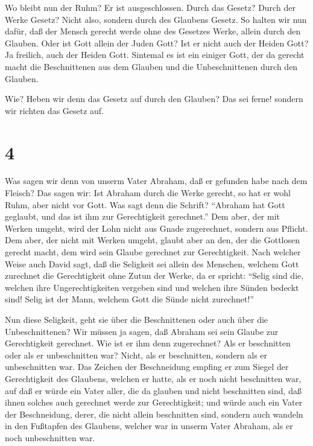  Wo bleibt nun der Ruhm? Er ist ausgeschlossen. Durch das
Gesetz? Durch der Werke Gesetz? Nicht also, sondern durch des Glaubens
Gesetz.  So halten wir nun dafür, daß der Mensch gerecht
werde ohne des Gesetzes Werke, allein durch den Glauben. 
Oder ist Gott allein der Juden Gott? Ist er nicht auch der Heiden Gott?
Ja freilich, auch der Heiden Gott.  Sintemal es ist ein
einiger Gott, der da gerecht macht die Beschnittenen aus dem Glauben und
die Unbeschnittenen durch den Glauben.

 Wie? Heben wir denn das Gesetz auf durch den Glauben? Das
sei ferne! sondern wir richten das Gesetz auf.

\hypertarget{section-3}{%
\section{4}\label{section-3}}

 Was sagen wir denn von unserm Vater Abraham, daß er
gefunden habe nach dem Fleisch?  Das sagen wir: Ist Abraham
durch die Werke gerecht, so hat er wohl Ruhm, aber nicht vor Gott.
 Was sagt denn die Schrift? ``Abraham hat Gott geglaubt, und
das ist ihm zur Gerechtigkeit gerechnet.''  Dem aber, der
mit Werken umgeht, wird der Lohn nicht aus Gnade zugerechnet, sondern
aus Pflicht.  Dem aber, der nicht mit Werken umgeht, glaubt
aber an den, der die Gottlosen gerecht macht, dem wird sein Glaube
gerechnet zur Gerechtigkeit.  Nach welcher Weise auch David
sagt, daß die Seligkeit sei allein des Menschen, welchem Gott zurechnet
die Gerechtigkeit ohne Zutun der Werke, da er spricht: 
``Selig sind die, welchen ihre Ungerechtigkeiten vergeben sind und
welchen ihre Sünden bedeckt sind!  Selig ist der Mann,
welchem Gott die Sünde nicht zurechnet!''

 Nun diese Seligkeit, geht sie über die Beschnittenen oder
auch über die Unbeschnittenen? Wir müssen ja sagen, daß Abraham sei sein
Glaube zur Gerechtigkeit gerechnet.  Wie ist er ihm denn
zugerechnet? Als er beschnitten oder als er unbeschnitten war? Nicht,
als er beschnitten, sondern als er unbeschnitten war.  Das
Zeichen der Beschneidung empfing er zum Siegel der Gerechtigkeit des
Glaubens, welchen er hatte, als er noch nicht beschnitten war, auf daß
er würde ein Vater aller, die da glauben und nicht beschnitten sind, daß
ihnen solches auch gerechnet werde zur Gerechtigkeit;  und
würde auch ein Vater der Beschneidung, derer, die nicht allein
beschnitten sind, sondern auch wandeln in den Fußtapfen des Glaubens,
welcher war in unserm Vater Abraham, als er noch unbeschnitten war.

